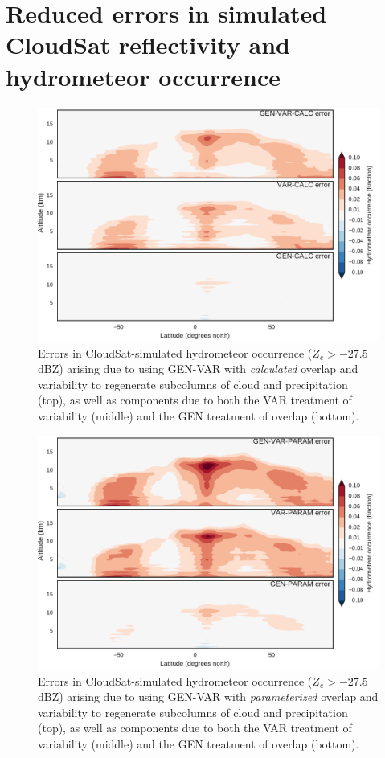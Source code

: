 \section{Reduced errors in simulated CloudSat reflectivity and hydrometeor occurrence}
\label{subgrid2_active_section}

\begin{figure}
\centering
\includegraphics[width=\columnwidth]{graphics/subgrid2_hfba_zonal_gen-var-calc_diff.pdf}
\caption{Errors in CloudSat-simulated hydrometeor occurrence ($Z_e > -27.5$ dBZ) arising due to using GEN-VAR with \emph{calculated} overlap and variability to regenerate subcolumns of cloud and precipitation (top), as well as components due to both the VAR treatment of variability (middle) and the GEN treatment of overlap (bottom).}
\label{sgi_hfba_zonal_diff}
\end{figure}

\begin{figure}
\centering
\includegraphics[width=\columnwidth]{graphics/subgrid2_hfba_zonal_gen-var-param_diff.pdf}
\caption{Errors in CloudSat-simulated hydrometeor occurrence ($Z_e > -27.5$ dBZ) arising due to using GEN-VAR with \emph{parameterized} overlap and variability to regenerate subcolumns of cloud and precipitation (top), as well as components due to both the VAR treatment of variability (middle) and the GEN treatment of overlap (bottom).}
\label{sgi_hfba_zonal_gen-var-param_diff}
\end{figure}

